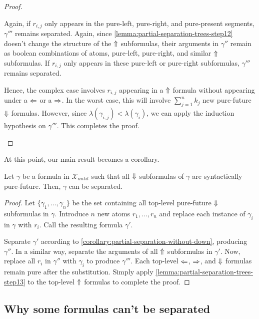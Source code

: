 \documentclass[a4paper,UKenglish,cleveref, autoref, thm-restate, numberwithinsect]{lipics-v2021}
\def\Larrow{\ensuremath\mathord{\Leftarrow}}
\def\Rarrow{\ensuremath\mathord{\Rightarrow}}
\def\Uarrow{\ensuremath\mathord{\Uparrow}}
\def\Darrow{\ensuremath\mathord{\Downarrow}}
\begin{document}
\begin{proof}
\begin{description}
        Again, if $r_{i, j}$ only appears in the pure-left, pure-right, and pure-present segments, $\gamma'''$ remains separated. Again, since \cref{lemma:partial-separation-trees-step12} doesn't change the structure of the $\Uarrow$ subformulas, their arguments in $\gamma''$ remain as boolean combinations of atoms, pure-left, pure-right, and similar $\Uarrow$ subformulas. If $r_{i, j}$ only appears in these pure-left or pure-right subformulas, $\gamma'''$ remains separated.

        Hence, the complex case involves $r_{i, j}$ appearing in a $\Uarrow$ formula without appearing under a $\Larrow$ or a $\Rarrow$. In the worst case, this will involve $\sum_{j=1}^{n} k_j$ new pure-future $\Darrow$ formulas. However, since $\lambda(\gamma_{i, j}) < \lambda(\gamma_i)$, we can apply the induction hypothesis on $\gamma'''$. This completes the proof.
    \end{description}
\end{proof}
At this point, our main result becomes a corollary.
\begin{corollary}
    \label{corollary:partial-separation-final}
    Let $\gamma$ be a formula in $\mathcal{X}_{until}$ such that all $\Darrow$ subformulas of $\gamma$ are syntactically pure-future. Then, $\gamma$ can be separated.
\end{corollary}
\begin{proof}
    Let $\{\gamma_1, \ldots, \gamma_n\}$ be the set containing all top-level pure-future $\Darrow$ subformulas in $\gamma$. Introduce $n$ new atoms $r_1, \ldots, r_n$ and replace each instance of $\gamma_i$ in $\gamma$ with $r_i$. Call the resulting formula $\gamma'$.

    Separate $\gamma'$ according to \cref{corollary:partial-separation-without-down}, producing $\gamma''$. In a similar way, separate the arguments of all $\Uarrow$ subformulas in $\gamma'$. Now, replace all $r_i$ in $\gamma''$ with $\gamma_i$ to produce $\gamma'''$. Each top-level $\Larrow$, $\Rarrow$, and $\Darrow$ formulas remain pure after the substitution. Simply apply \cref{lemma:partial-separation-trees-step13} to the top-level $\Uarrow$ formulas to complete the proof.
\end{proof}

\subsection{Why some formulas can't be separated}
\label{sec:ef-games-start}
\end{document}
